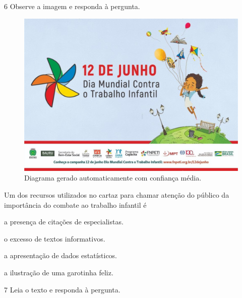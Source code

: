 \pagebreak
\num{6} Observe a imagem e responda à pergunta.

\begin{figure}[htpb!]
\centering
\includegraphics[width=\textwidth]{./imgQ4PORT/media/image6.jpeg}
\caption{Diagrama gerado automaticamente com confiança média.}
\end{figure}



Um dos recursos utilizados no cartaz para chamar atenção do público da importância do combate ao trabalho infantil é

\begin{escolha}
  \item a presença de citações de especialistas.

  \item o excesso de textos informativos.

  \item a apresentação de dados estatísticos.

  \item a ilustração de uma garotinha feliz.
\end{escolha}

\pagebreak
\num{7} Leia o texto e responda à pergunta.

